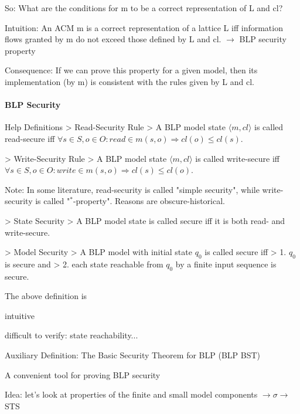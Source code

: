 \documentclass[a4paper]{article}
\begin{document}
\begin{multicols}{3}
    So: What are the conditions for m to be a correct representation of L and cl?

    Intuition: An ACM m is a correct representation of a lattice L iff information flows granted by m do not exceed those defined by L and cl. $\rightarrow$ BLP security property

    Consequence: If we can prove this property for a given model, then its implementation (by m) is consistent with the rules given by L and cl.

    \paragraph{BLP Security}
    Help Definitions
    > Read-Security Rule
    > A BLP model state $⟨m,cl⟩$ is called read-secure iff $\forall s\in S,o\in O:read\in m(s,o)\Rightarrow cl(o) \leq cl(s)$.

    > Write-Security Rule
    > A BLP model state $⟨m,cl⟩$ is called write-secure iff $\forall s\in S,o\in O:write\in m(s,o)\Rightarrow cl(s)\leq cl(o)$.

    Note: In some literature, read-security is called "simple security", while write-security is called "$^*$-property". Reasons are obscure-historical.

    > State Security
    > A BLP model state is called secure iff it is both read- and write-secure.

    > Model Security
    > A BLP model with initial state $q_0$ is called secure iff
    > 1. $q_0$ is secure and
    > 2. each state reachable from $q_0$ by a finite input sequence is secure.

    The above definition is
    \begin{itemize*}
        \item intuitive
        \item difficult to verify: state reachability...
    \end{itemize*}

    Auxiliary Definition: The Basic Security Theorem for BLP (BLP BST)
    \begin{itemize*}
        \item A convenient tool for proving BLP security
        \item Idea: let’s look at properties of the finite and small model components $\rightarrow\sigma\rightarrow$ STS
    \end{itemize*}



\end{multicols}
\end{document}
